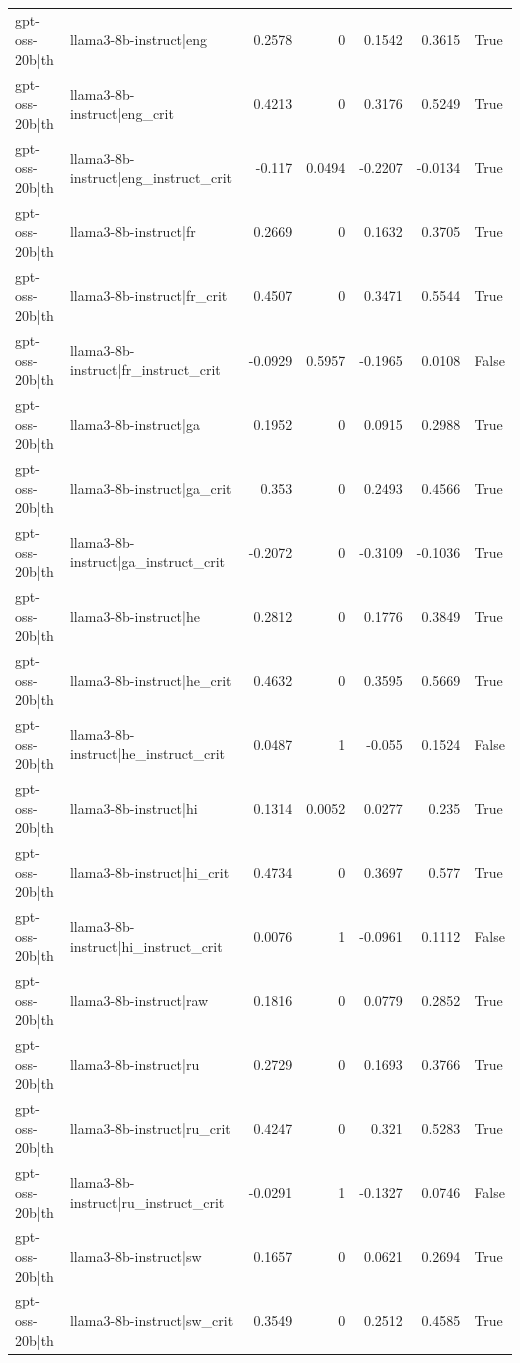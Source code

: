 \begin{table}
\begin{tabular}{l l r r r r l}
gpt-oss-20b|th & llama3-8b-instruct|eng & 0.2578 & 0 & 0.1542 & 0.3615 & True \\
gpt-oss-20b|th & llama3-8b-instruct|eng_crit & 0.4213 & 0 & 0.3176 & 0.5249 & True \\
gpt-oss-20b|th & llama3-8b-instruct|eng_instruct_crit & -0.117 & 0.0494 & -0.2207 & -0.0134 & True \\
gpt-oss-20b|th & llama3-8b-instruct|fr & 0.2669 & 0 & 0.1632 & 0.3705 & True \\
gpt-oss-20b|th & llama3-8b-instruct|fr_crit & 0.4507 & 0 & 0.3471 & 0.5544 & True \\
gpt-oss-20b|th & llama3-8b-instruct|fr_instruct_crit & -0.0929 & 0.5957 & -0.1965 & 0.0108 & False \\
gpt-oss-20b|th & llama3-8b-instruct|ga & 0.1952 & 0 & 0.0915 & 0.2988 & True \\
gpt-oss-20b|th & llama3-8b-instruct|ga_crit & 0.353 & 0 & 0.2493 & 0.4566 & True \\
gpt-oss-20b|th & llama3-8b-instruct|ga_instruct_crit & -0.2072 & 0 & -0.3109 & -0.1036 & True \\
gpt-oss-20b|th & llama3-8b-instruct|he & 0.2812 & 0 & 0.1776 & 0.3849 & True \\
gpt-oss-20b|th & llama3-8b-instruct|he_crit & 0.4632 & 0 & 0.3595 & 0.5669 & True \\
gpt-oss-20b|th & llama3-8b-instruct|he_instruct_crit & 0.0487 & 1 & -0.055 & 0.1524 & False \\
gpt-oss-20b|th & llama3-8b-instruct|hi & 0.1314 & 0.0052 & 0.0277 & 0.235 & True \\
gpt-oss-20b|th & llama3-8b-instruct|hi_crit & 0.4734 & 0 & 0.3697 & 0.577 & True \\
gpt-oss-20b|th & llama3-8b-instruct|hi_instruct_crit & 0.0076 & 1 & -0.0961 & 0.1112 & False \\
gpt-oss-20b|th & llama3-8b-instruct|raw & 0.1816 & 0 & 0.0779 & 0.2852 & True \\
gpt-oss-20b|th & llama3-8b-instruct|ru & 0.2729 & 0 & 0.1693 & 0.3766 & True \\
gpt-oss-20b|th & llama3-8b-instruct|ru_crit & 0.4247 & 0 & 0.321 & 0.5283 & True \\
gpt-oss-20b|th & llama3-8b-instruct|ru_instruct_crit & -0.0291 & 1 & -0.1327 & 0.0746 & False \\
gpt-oss-20b|th & llama3-8b-instruct|sw & 0.1657 & 0 & 0.0621 & 0.2694 & True \\
gpt-oss-20b|th & llama3-8b-instruct|sw_crit & 0.3549 & 0 & 0.2512 & 0.4585 & True \\

\end{tabular}
\end{table}
